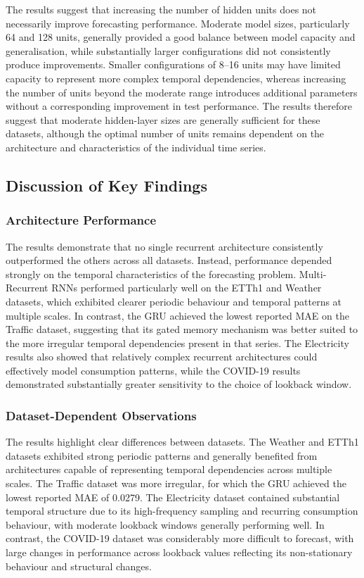 \documentclass[conference]{IEEEtran}
\begin{document}
The results suggest that increasing the number of hidden units does
not necessarily improve forecasting performance. Moderate model sizes,
particularly 64 and 128 units, generally provided a good balance between
model capacity and generalisation, while substantially larger configurations
did not consistently produce improvements. Smaller configurations of 8--16
units may have limited capacity to represent more complex temporal dependencies,
whereas increasing the number of units beyond the moderate range introduces
additional parameters without a corresponding improvement in test performance.
The results therefore suggest that moderate hidden-layer sizes are generally
sufficient for these datasets, although the optimal number of units remains
dependent on the architecture and characteristics of the individual time series.


\subsection{Discussion of Key Findings}

\subsubsection{Architecture Performance}

The results demonstrate that no single recurrent architecture
consistently outperformed the others across all datasets. Instead,
performance depended strongly on the temporal characteristics of the
forecasting problem. Multi-Recurrent RNNs performed particularly well
on the ETTh1 and Weather datasets, which exhibited clearer periodic
behaviour and temporal patterns at multiple scales. In contrast, the
GRU achieved the lowest reported MAE on the Traffic dataset,
suggesting that its gated memory mechanism was better suited to the more
irregular temporal dependencies present in that series. The Electricity
results also showed that relatively complex recurrent architectures
could effectively model consumption patterns, while the COVID-19
results demonstrated substantially greater sensitivity to the choice
of lookback window.

\subsubsection{Dataset-Dependent Observations}

The results highlight clear differences between datasets. The
Weather and ETTh1 datasets exhibited strong periodic patterns and
generally benefited from architectures capable of representing temporal
dependencies across multiple scales. The Traffic dataset was more
irregular, for which the GRU achieved the lowest reported MAE of 0.0279.
The Electricity dataset contained substantial temporal structure due to
its high-frequency sampling and recurring consumption behaviour, with
moderate lookback windows generally performing well. In contrast, the
COVID-19 dataset was considerably more difficult to forecast, with
large changes in performance across lookback values reflecting its non-stationary
behaviour and structural changes.
\end{document}
